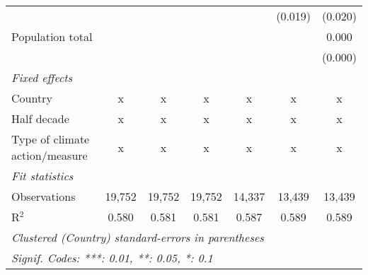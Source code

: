 \begin{tabular}{lcccccc}
                                                                             &         &                &                &                & (0.019)        & (0.020)\\   
   Population total                                                          &         &                &                &                &                & 0.000\\   
                                                                             &         &                &                &                &                & (0.000)\\   
   \emph{Fixed effects}\\
   Country                                                                   & x       & x              & x              & x              & x              & x\\  
   Half decade                                                               & x       & x              & x              & x              & x              & x\\  
   Type of climate action/measure                                            & x       & x              & x              & x              & x              & x\\  
   \midrule \emph{Fit statistics}\\
   Observations                                                              & 19,752  & 19,752         & 19,752         & 14,337         & 13,439         & 13,439\\  
   R$^2$                                                                     & 0.580   & 0.581          & 0.581          & 0.587          & 0.589          & 0.589\\  
   \midrule
   \multicolumn{7}{l}{\emph{Clustered (Country) standard-errors in parentheses}}\\
   \multicolumn{7}{l}{\emph{Signif. Codes: ***: 0.01, **: 0.05, *: 0.1}}\\
\end{tabular}
\par\endgroup


